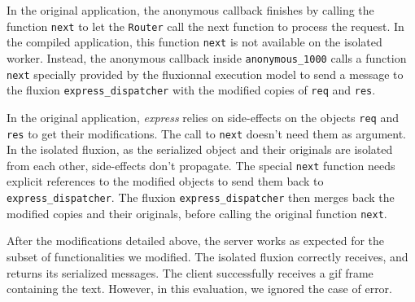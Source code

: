 In the original application, the anonymous callback finishes by calling the function \texttt{next} to let the \texttt{Router} call the next function to process the request.
In the compiled application, this function \texttt{next} is not available on the isolated worker.
Instead, the anonymous callback inside \texttt{anonymous\-\_1000} calls a function \texttt{next} specially provided by the fluxionnal execution model to send a message to the fluxion \texttt{express\-\_dispatcher} with the modified copies of \texttt{req} and \texttt{res}.

In the original application, \textit{express} relies on side-effects on the objects \texttt{req} and \texttt{res} to get their modifications.
The call to \texttt{next} doesn't need them as argument.
In the isolated fluxion, as the serialized object and their originals are isolated from each other, side-effects don't propagate.
The special \texttt{next} function needs explicit references to the modified objects to send them back to \texttt{express\_dispatcher}.
The fluxion \texttt{express\_dispatcher} then merges back the modified copies and their originals, before calling the original function \texttt{next}.

After the modifications detailed above, the server works as expected for the subset of functionalities we modified.
The isolated fluxion correctly receives, and returns its serialized messages.
The client successfully receives a gif frame containing the text.
However, in this evaluation, we ignored the case of error.



